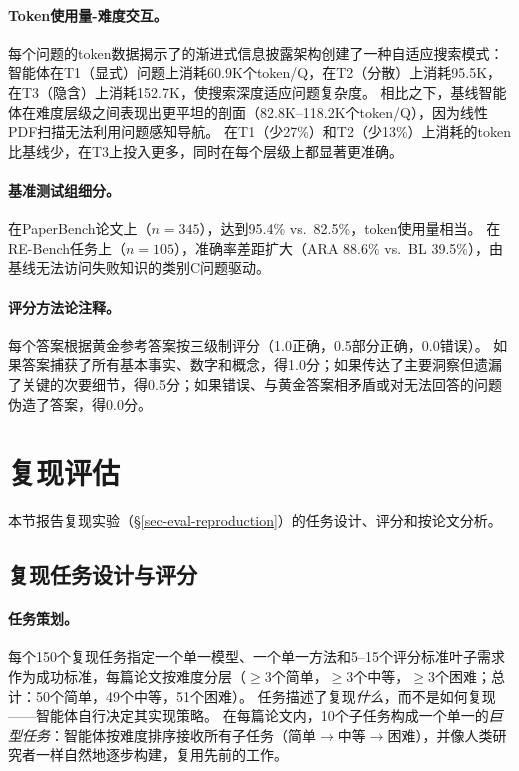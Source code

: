 \paragraph{Token使用量-难度交互。}
每个问题的token数据揭示了\ara{}的渐进式信息披露架构创建了一种自适应搜索模式：\ara{}智能体在T1（显式）问题上消耗60.9K个token/Q，在T2（分散）上消耗95.5K，在T3（隐含）上消耗152.7K，使搜索深度适应问题复杂度。
相比之下，基线智能体在难度层级之间表现出更平坦的剖面（82.8K--118.2K个token/Q），因为线性PDF扫描无法利用问题感知导航。
\ara{}在T1（少27\%）和T2（少13\%）上消耗的token比基线少，在T3上投入更多，同时在每个层级上都显著更准确。

\paragraph{基准测试组细分。}
在PaperBench论文上（$n = 345$），\ara{}达到95.4\% vs.\ 82.5\%，token使用量相当。
在RE-Bench任务上（$n = 105$），准确率差距扩大（ARA 88.6\% vs.\ BL 39.5\%），由基线无法访问失败知识的类别C问题驱动。
\paragraph{评分方法论注释。}
每个答案根据黄金参考答案按三级制评分（1.0正确，0.5部分正确，0.0错误）。
如果答案捕获了所有基本事实、数字和概念，得1.0分；如果传达了主要洞察但遗漏了关键的次要细节，得0.5分；如果错误、与黄金答案相矛盾或对无法回答的问题伪造了答案，得0.0分。


\section{复现评估}
\label{sec-reproduction-eval}

本节报告复现实验（\S\ref{sec-eval-reproduction}）的任务设计、评分和按论文分析。

\subsection{复现任务设计与评分}
\label{sec-repro-scoring}

\paragraph{任务策划。}
每个150个复现任务指定一个单一模型、一个单一方法和5--15个评分标准叶子需求作为成功标准，每篇论文按难度分层（$\geq$3个简单，$\geq$3个中等，$\geq$3个困难；总计：50个简单，49个中等，51个困难）。
任务描述了复现\emph{什么}，而不是如何复现——智能体自行决定其实现策略。
在每篇论文内，10个子任务构成一个单一的\emph{巨型任务}：智能体按难度排序接收所有子任务（简单$\to$中等$\to$困难），并像人类研究者一样自然地逐步构建，复用先前的工作。

